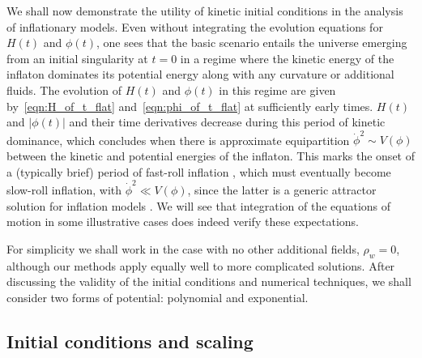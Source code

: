 We shall now demonstrate the utility of kinetic initial conditions in the analysis of inflationary models. Even without integrating the evolution equations for \(H(t)\) and \(\phi(t)\), one sees that the basic scenario entails the universe emerging from an initial singularity at \(t=0\) in a regime where the kinetic energy of the inflaton dominates its potential energy along with any curvature or additional fluids.  The evolution of \(H(t)\) and \(\phi(t)\) in this regime are given by~\eqref{eqn:H_of_t_flat} and~\eqref{eqn:phi_of_t_flat} at sufficiently early times.  \(H(t)\) and \(|\phi(t)|\) and their time derivatives decrease during this period of kinetic dominance, which concludes when there is approximate equipartition \(\dot{\phi}^2 \sim V(\phi)\) between the kinetic and potential energies of the inflaton.  This marks the onset of a (typically brief) period of fast-roll inflation \citep{Linde:2001}, which must eventually become slow-roll inflation, with \(\dot{\phi}^2 \ll V(\phi)\), since the latter is a generic attractor solution for inflation models \citep{belinsky_inflationary_1985}.  We will see that integration of the equations of motion in some illustrative cases does indeed verify these expectations.

For simplicity we shall work in the case with no other additional fields, \(\rho_w=0\), although our methods apply equally well to more complicated solutions. After discussing the validity of the initial conditions and numerical techniques, we shall consider two forms of potential: polynomial and exponential.

\subsection{Initial conditions and scaling}

